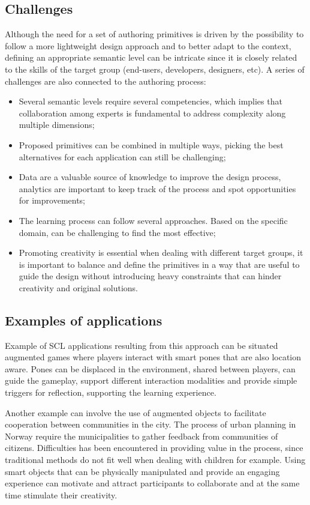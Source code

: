 \subsection{Challenges}
Although the need for a set of authoring primitives is driven by the possibility to follow a more lightweight design approach and to better adapt to the context, defining an appropriate semantic level can be intricate since it is closely related to the skills of the target group (end-users, developers, designers, etc).
A series of challenges are also connected to the authoring process:

\begin{itemize}
    \item Several semantic levels require several competencies, which implies that collaboration among experts is fundamental to address complexity along multiple dimensions;
    \item Proposed primitives can be combined in multiple ways, picking the best alternatives for each application can still be challenging;
    \item Data are a valuable source of knowledge to improve the design process, analytics are important to keep track of the process and spot opportunities for improvements;
    \item The learning process can follow several approaches. Based on the specific domain, can be challenging to find the most effective;
    \item Promoting creativity is essential when dealing with different target groups, it is important to balance and define the primitives in a way that are useful to guide the design without introducing heavy constraints that can hinder creativity and original solutions.
\end{itemize}

\subsection{Examples of applications}
Example of SCL applications resulting from this approach can be situated augmented games where players interact with smart pones that are also location aware. Pones can be displaced in the environment, shared between players, can guide the gameplay, support different interaction modalities and provide simple triggers for reflection, supporting the learning experience.

Another example can involve the use of augmented objects to facilitate cooperation between communities in the city. The process of urban planning in Norway require the municipalities to gather feedback from communities of citizens.
Difficulties has been encountered in providing value in the process, since traditional methods do not fit well when dealing with children for example.
Using smart objects that can be physically manipulated and provide an engaging experience can motivate and attract participants to collaborate and at the same time stimulate their creativity.

